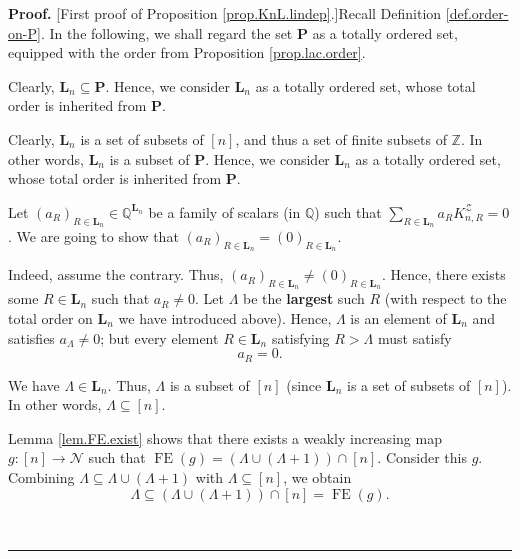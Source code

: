 \documentclass[numbers=enddot,12pt,final,onecolumn,notitlepage]{scrartcl}%
\theoremstyle{definition}
\newenvironment{proof}[1][Proof]{\noindent\textbf{#1.} }{\ \rule{0.5em}{0.5em}}
\newenvironment{verlong}{}{}
\newenvironment{vershort}{}{}
\let\sumnonlimits\sum
\renewcommand{\sum}{\sumnonlimits\limits}
\begin{document}
\begin{proof}
[First proof of Proposition \ref{prop.KnL.lindep}.]Recall Definition
\ref{def.order-on-P}. In the following, we shall regard the set $\mathbf{P}$
as a totally ordered set, equipped with the order from Proposition
\ref{prop.lac.order}.

\begin{vershort}
Clearly, $\mathbf{L}_{n}\subseteq\mathbf{P}$. Hence, we consider
$\mathbf{L}_{n}$ as a totally ordered set, whose total order is inherited from
$\mathbf{P}$.
\end{vershort}

\begin{verlong}
Clearly, $\mathbf{L}_{n}$ is a set of subsets of $\left[  n\right]  $, and
thus a set of finite subsets of $\mathbb{Z}$. In other words, $\mathbf{L}_{n}$
is a subset of $\mathbf{P}$. Hence, we consider $\mathbf{L}_{n}$ as a totally
ordered set, whose total order is inherited from $\mathbf{P}$.
\end{verlong}

Let $\left(  a_{R}\right)  _{R\in\mathbf{L}_{n}}\in\mathbb{Q}^{\mathbf{L}_{n}%
}$ be a family of scalars (in $\mathbb{Q}$) such that $\sum_{R\in
\mathbf{L}_{n}}a_{R}K_{n,R}^{\mathcal{Z}}=0$. We are going to show that
$\left(  a_{R}\right)  _{R\in\mathbf{L}_{n}}=\left(  0\right)  _{R\in
\mathbf{L}_{n}}$.

Indeed, assume the contrary. Thus, $\left(  a_{R}\right)  _{R\in\mathbf{L}%
_{n}}\neq\left(  0\right)  _{R\in\mathbf{L}_{n}}$. Hence, there exists some
$R\in\mathbf{L}_{n}$ such that $a_{R}\neq0$. Let $\Lambda$ be the
\textbf{largest} such $R$ (with respect to the total order on $\mathbf{L}_{n}$
we have introduced above). Hence, $\Lambda$ is an element of $\mathbf{L}_{n}$
and satisfies $a_{\Lambda}\neq0$; but every element $R\in\mathbf{L}_{n}$
satisfying $R>\Lambda$ must satisfy%
\begin{equation}
a_{R}=0. \label{pf.prop.KnL.lindep.larger=0}%
\end{equation}

\begin{verlong}
We have $\Lambda \in \mathbf{L}_n$. Thus, $\Lambda$ is a subset of
$\left[ n\right]$ (since $\mathbf{L}_n$ is a set of subsets of
$\left[ n\right]$). In other words, $\Lambda \subseteq \left[n\right]$.
\end{verlong}

Lemma \ref{lem.FE.exist} shows that there exists a weakly increasing map
$g:\left[  n\right]  \rightarrow\mathcal{N}$ such that $\operatorname*{FE}%
\left(  g\right)  =\left(  \Lambda\cup\left(  \Lambda+1\right)  \right)
\cap\left[  n\right]  $. Consider this $g$. Combining $\Lambda\subseteq
\Lambda\cup\left(  \Lambda+1\right)  $ with $\Lambda\subseteq\left[  n\right]
$, we obtain
\[
\Lambda\subseteq\left(  \Lambda\cup\left(  \Lambda+1\right)  \right)
\cap\left[  n\right]  =\operatorname*{FE}\left(  g\right)  .
\]



\end{proof}
\end{document}
